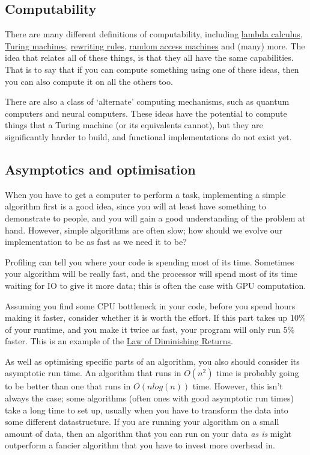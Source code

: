 \subsection{Computability}

There are many different definitions of computability, including
\href{https://en.wikipedia.org/wiki/Lambda_calculus}{lambda calculus},
\href{https://en.wikipedia.org/wiki/Turing_machine}{Turing machines},
\href{https://en.wikipedia.org/wiki/Rewriting}{rewriting rules},
\href{https://en.wikipedia.org/wiki/Random-access_machine}{random access
machines} and (many) more. The idea that relates all of these things, is that
they all have the same capabilities. That is to say that if you can compute
something using one of these ideas, then you can also compute it on all the
others too.

There are also a class of `alternate' computing mechanisms, such as quantum
computers and neural computers. These ideas have the potential to compute things
that a Turing machine (or its equivalents cannot), but they are significantly
harder to build, and functional implementations do not exist yet.

\subsection{Asymptotics and optimisation}

When you have to get a computer to perform a task, implementing a simple
algorithm first is a good idea, since you will at least have something to
demonstrate to people, and you will gain a good understanding of the problem at
hand. However, simple algorithms are often slow; how should we evolve our
implementation to be as fast as we need it to be?

Profiling can tell you where your code is spending most of its time. Sometimes
your algorithm will be really fast, and the processor will spend most of its
time waiting for IO to give it more data; this is often the case with GPU
computation.

Assuming you find some CPU bottleneck in your code, before you spend hours
making it faster, consider whether it is worth the effort. If this part takes up
10\% of your runtime, and you make it twice as fast, your program will only run
5\% faster. This is an example of the
\href{https://en.wikipedia.org/wiki/Diminishing_returns}{Law of Diminishing
Returns}.

As well as optimising specific parts of an algorithm, you also should consider
its asymptotic run time. An algorithm that runs in $O(n^2)$ time is probably
going to be better than one that runs in $O(n log(n))$ time. However, this isn't
always the case; some algorithms (often ones with good asymptotic run times)
take a long time to set up, usually when you have to transform the data into
some different datastructure. If you are running your algorithm on a small
amount of data, then an algorithm that you can run on your data \textit{as is}
might outperform a fancier algorithm that you have to invest more overhead in.

